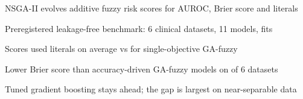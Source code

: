\item NSGA-II evolves additive fuzzy risk scores for AUROC, Brier score and literals
\item Preregistered leakage-free benchmark: 6 clinical datasets, 11 models, \resNFits{} fits
\item Scores used \resMOLiteralsAll{} literals on average vs \resHybridLiteralsAll{} for single-objective GA-fuzzy
\item Lower Brier score than accuracy-driven GA-fuzzy models on \resHOneWins{} of 6 datasets
\item Tuned gradient boosting stays ahead; the gap is largest on near-separable data
